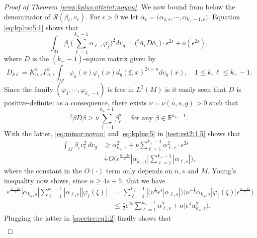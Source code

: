 \documentclass[10pt]{amsart}
\numberwithin{equation}{section}
\newcommand{\R}{\mathbb{R}}
\def\ep{{\varepsilon}}
\newcommand{\ve}{\varepsilon}
\newcommand{\vp}{\varphi}
\def \ep{\epsilon}
\theoremstyle{plain}
\theoremstyle{remark}
\begin{document}
\begin{proof}[Proof of Theorem \ref{prop:kplus:atteint:noyau}]
\medskip

We now bound from below the denominator of $\mathcal{R}(\beta_\ep, v_\ep)$. For $\ep >0$ we let $\bar{\alpha}_\ep = \big( \alpha_{1, \ep}, \cdots, \alpha_{k_+-1, \ep} \big)$. Equation \eqref{eq:kplus:5:1} shows that %
\begin{equation} \label{eq:minor:noyau}
 \int_M \beta_\ep \Big( \sum_{\ell=1}^{k_+-1} \alpha_{\ell,\ep} \vp_\ell \Big)^2 dv_g =  \big({}^{t} \bar{\alpha}_\ep D \bar{\alpha}_\ep \big) \cdot  \ep^{2s} + o(\ep^{2s}),
 \end{equation}
 where $D$ is the $(k_+-1)$-square matrix given by 
 $$ D_{k\ell} = K_{n,s}^{2} \Gamma_{n,s}^2 \int_M  \vp_k(x) \vp_\ell(x) d_g(\xi,x)^{2s-n} dv_g(x), \quad 1 \le k, \ell  \le k_+-1. $$
Since the family $(\vp_1, \cdots, \vp_{k_+-1})$ is free in $L^2(M)$ is it easily seen that $D$ is positive-definite: as a consequence, there exists $\nu = \nu(n,s,g) >0$ such that 
$$ {}^{t} \beta D \beta \ge \nu \sum_{\ell=1}^{k_+-1} \beta_{\ell}^2 \quad \text{ for any } \beta \in \R^{k_+-1}. $$
With the latter, \eqref{eq:minor:noyau} and \eqref{eq:kplus:5} in  \eqref{test:est2:1.5} shows that 
\begin{equation}  \label{spectre:eq1:2}
\begin{aligned}
	\int_{M} \beta_\ep  v_{\ep}^2\, dv_g & \ge \alpha_{k_+,\ep}^2 + \nu \sum_{\ell=1}^{k_+-1}\alpha_{\ell,\ep}^2 \cdot \ep^{2s} \\
	&+ O \Big(\ep^{\frac{n-2s}{2}}|\alpha_{k_+,\ep}|\sum_{\ell=1}^{k_+-1}|\alpha_{\ell,\ep}|  \Big), 
	\end{aligned} 
\end{equation}
where the constant in the $O(\cdot)$ term only depends on $n,s$ and $M$. Young's inequality now shows, since $n \ge 4s + 5$, that we have 
$$ \begin{aligned}
 \ve^{\frac{n-2s}{2}}|\alpha_{k_+,\ep}|\sum_{\ell=1}^{k_+-1}|\alpha_{\ell,\ep}| |\vp_\ell(\xi)| 
  &  = \sum_{\ell=1}^{k_+-1}| \big(  \nu^{\frac{1}{2}} \ep^{s} |\alpha_{\ell,\ep}| \big) \big( \nu^{-\frac{1}{2}} \alpha_{k_+,\ep}|\vp_\ell(\xi)|  \ep^{\frac{n-4s}{2}} \big)\\
  & \le \frac{\nu}{2} \ep^{2s} \sum_{\ell=1}^{k_+-1}\alpha_{\ell,\ep}^2 + o \big( \ep^{4} \alpha_{k_+,\ep}^2 \big).
 \end{aligned} $$
Plugging the latter in \eqref{spectre:eq1:2} finally shows that 
\begin{equation}  \label{spectre:eq1}
\begin{aligned}

\end{aligned}
\end{equation}
\end{proof}
\end{document}

